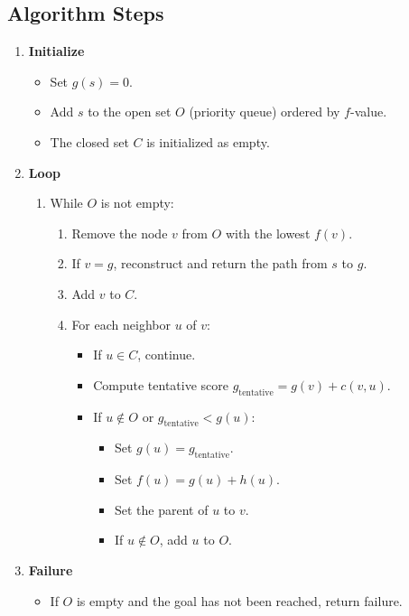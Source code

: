 \documentclass[12pt]{article}
\begin{document}
\subsection{Algorithm Steps}
\begin{enumerate}
\item \textbf{Initialize}
  \begin{itemize}
    \item Set \( g(s) = 0 \).
    \item Add \( s \) to the open set \( O \) (priority queue) ordered by \( f \)-value.
    \item The closed set \( C \) is initialized as empty.
  \end{itemize}
\item \textbf{Loop}
  \begin{enumerate}
    \item While \( O \) is not empty:
        \begin{enumerate}
            \item Remove the node \( v \) from \( O \) with the lowest \( f(v) \).
            \item If \( v = g \), reconstruct and return the path from \( s \) to \( g \).
            \item Add \( v \) to \( C \).
            \item For each neighbor \( u \) of \( v \):
              \begin{itemize}
                \item If \( u \in C \), continue.
                \item Compute tentative score \( g_{\text{tentative}} = g(v) + c(v, u) \).
                \item If \( u \notin O \) or \( g_{\text{tentative}} < g(u) \):
                  \begin{itemize}
                    \item Set \( g(u) = g_{\text{tentative}} \).
                    \item Set \( f(u) = g(u) + h(u) \).
                    \item Set the parent of \( u \) to \( v \).
                    \item If \( u \notin O \), add \( u \) to \( O \).
                \end{itemize}
            \end{itemize}
        \end{enumerate}
  \end{enumerate}
  \item \textbf{Failure}
    \begin{itemize}
        \item If \( O \) is empty and the goal has not been reached, return failure.
    \end{itemize}
\end{enumerate}
\end{document}
